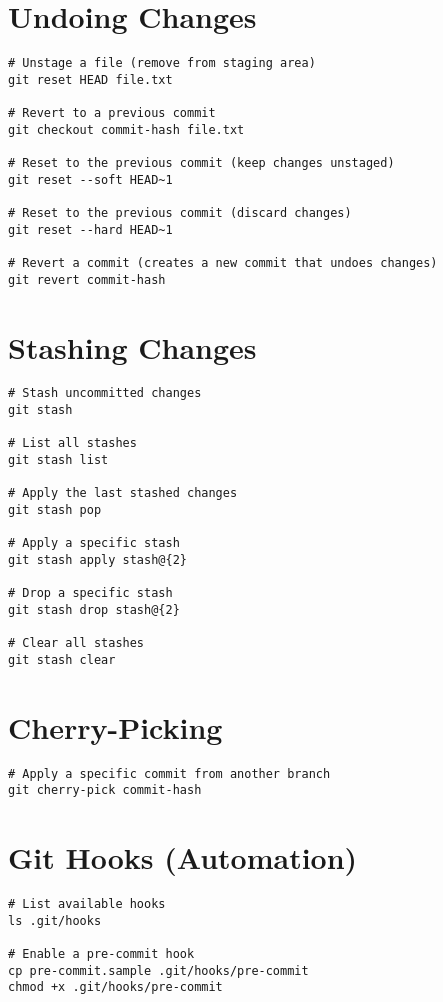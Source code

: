 \documentclass[11pt]{article}
\begin{document}
    \section*{Undoing Changes}
    \begin{lstlisting}[style=gitStyle]
# Unstage a file (remove from staging area)
git reset HEAD file.txt

# Revert to a previous commit
git checkout commit-hash file.txt

# Reset to the previous commit (keep changes unstaged)
git reset --soft HEAD~1

# Reset to the previous commit (discard changes)
git reset --hard HEAD~1

# Revert a commit (creates a new commit that undoes changes)
git revert commit-hash
    \end{lstlisting}

    \section*{Stashing Changes}
    \begin{lstlisting}[style=gitStyle]
# Stash uncommitted changes
git stash

# List all stashes
git stash list

# Apply the last stashed changes
git stash pop

# Apply a specific stash
git stash apply stash@{2}

# Drop a specific stash
git stash drop stash@{2}

# Clear all stashes
git stash clear
    \end{lstlisting}

    \section*{Cherry-Picking}
    \begin{lstlisting}[style=gitStyle]
# Apply a specific commit from another branch
git cherry-pick commit-hash
    \end{lstlisting}

    \section*{Git Hooks (Automation)}
    \begin{lstlisting}[style=gitStyle]
# List available hooks
ls .git/hooks

# Enable a pre-commit hook
cp pre-commit.sample .git/hooks/pre-commit
chmod +x .git/hooks/pre-commit
    \end{lstlisting}
\end{document}

